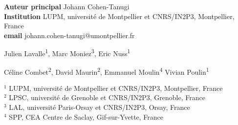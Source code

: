
\def\altaffilmark#1{\textsuperscript{#1}}
\def\affil#1{\noindent #1 \\}

%

\begin{flushleft}
  {\bf Auteur principal}  Johann Cohen-Tanugi\\
  {\bf Institution}  LUPM, université de Montpellier et CNRS/IN2P3, Montpellier, France\\
  {\bf email} johann.cohen-tanugi@umontpellier.fr
\end{flushleft}       


\begin{raggedright}
\small
Julien Lavalle\altaffilmark{1}, Marc Moniez\altaffilmark{3}, Eric Nuss\altaffilmark{1}
\end{raggedright}

\begin{raggedright}
\small
Céline Combet\altaffilmark{2},
David Maurin\altaffilmark{2},
Emmanuel Moulin\altaffilmark{4}
Vivian Poulin\altaffilmark{1}
\end{raggedright}

\scriptsize

\affil{$^{1}$ LUPM, université de Montpellier et CNRS/IN2P3, Montpellier, France}
\affil{$^{2}$ LPSC, université de Grenoble et CNRS/IN2P3, Grenoble, France}
\affil{$^{3}$ LAL, université Paris-Orsay et CNRS/IN2P3, Orsay, France}
\affil{$^{4}$ SPP, CEA Centre de Saclay, Gif-sur-Yvette, France}
\normalsize

